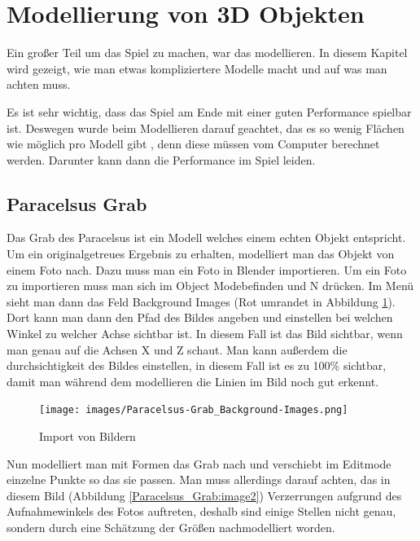 \section{Modellierung von 3D Objekten}
Ein großer Teil um das Spiel zu machen, war das modellieren. In diesem Kapitel wird gezeigt, wie man etwas kompliziertere
Modelle macht und auf was man achten muss.

Es ist sehr wichtig, dass das Spiel am Ende mit einer guten Performance spielbar ist. Deswegen wurde beim Modellieren darauf geachtet,
das es so wenig Flächen wie möglich pro Modell gibt \citep{unreal:modellierungVon3dObjekten_performance}, denn diese müssen vom Computer berechnet werden.
Darunter kann dann die Performance im Spiel leiden.

\label{sec:Modellierung_von_3D_Objekten}
\subsection{Paracelsus Grab}
Das Grab des Paracelsus ist ein Modell welches einem echten Objekt entspricht. Um ein originalgetreues Ergebnis zu erhalten,
modelliert man das Objekt von einem Foto nach. Dazu muss man ein Foto in Blender importieren. Um ein Foto zu importieren muss man sich im \dq Object Mode\dq befinden und \dq N\dq
drücken. Im Menü sieht man dann das Feld Background Images (Rot umrandet in Abbildung \ref{Paracelsus_Grab:image1}). Dort kann man dann den Pfad des Bildes angeben
und einstellen bei welchen Winkel zu welcher Achse sichtbar ist. In diesem Fall ist das Bild sichtbar, wenn man genau auf die Achsen X und Z schaut. Man kann außerdem die
durchsichtigkeit des Bildes einstellen, in diesem Fall ist es zu 100\% sichtbar, damit man während dem modellieren die Linien im Bild noch gut erkennt.

\begin{figure}[h]
    \centering
    \texttt{[image: images/Paracelsus-Grab\_Background-Images.png]}
    \caption{Import von Bildern}
    \label{Paracelsus_Grab:image1}
\end{figure}

Nun modelliert man mit Formen das Grab nach und verschiebt im Editmode einzelne Punkte so das sie passen. Man muss allerdings darauf achten, das in diesem Bild
(Abbildung \ref{Paracelsus_Grab:image2}) Verzerrungen aufgrund des Aufnahmewinkels des Fotos auftreten, deshalb sind einige Stellen nicht genau, sondern
durch eine Schätzung der Größen nachmodelliert worden.

